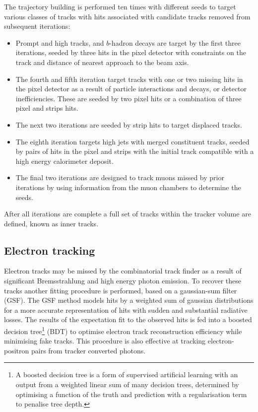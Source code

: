 The trajectory building is performed ten times with different seeds to target
various classes of tracks with hits associated with candidate tracks removed
from subsequent iterations:
\begin{itemize}
    \item Prompt and high \pt tracks, and $b$-hadron decays are target by the
    first three iterations, seeded by three hits in the pixel detector with
    constraints on the track \pt and distance of nearest approach to the beam axis.
    \item The fourth and fifth iteration target tracks with one or two missing
    hits in the pixel detector as a result of particle interactions and
    decays, or detector inefficiencies. These are seeded by two pixel hits or
    a combination of three pixel and strips hits.
    \item The next two iterations are seeded by strip hits to target displaced tracks.
    \item The eighth iteration targets high \pt jets with merged constituent
    tracks, seeded by pairs of hits in the pixel and strips with the initial
    track compatible with a high energy calorimeter deposit.
    \item The final two iterations are designed to track muons missed by prior
    iterations by using information from the muon chambers to determine the seeds.
\end{itemize}
After all iterations are complete a full set of tracks within the tracker
volume are defined, known as inner tracks.


\subsection{Electron tracking}

Electron tracks may be missed by the combinatorial track finder as a result of
significant Bremsstrahlung and high energy photon emission. To recover these
tracks another fitting procedure is performed, based on a gaussian-sum filter
(GSF). The GSF method models hits by a weighted sum of gaussian distributions
for a more accurate representation of hits with sudden and substantial
radiative losses. The results of the expectation fit to the observed hits is
fed into a boosted decision tree\footnote{A boosted decision tree is a form of
supervised artificial learning with an output from a weighted linear sum of
many decision trees, determined by optimising a function of the truth and
prediction with a regularisation term to penalise tree depth.} (BDT) to
optimise electron track reconstruction efficiency while minimising fake
tracks. This procedure is also effective at tracking electron-positron pairs
from tracker converted photons.



